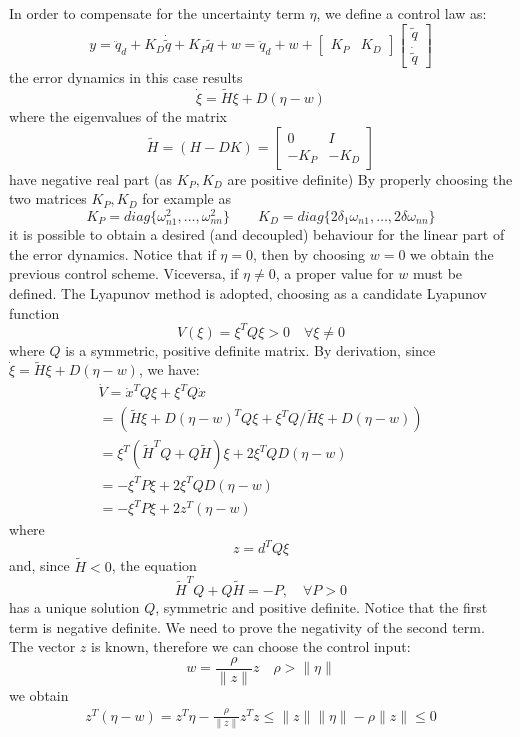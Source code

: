 \documentclass{book}
\begin{document}
In order to compensate for the uncertainty term $\eta$, we define a control law as:
\[
    y = \ddot{q}_d +K_D\dot{\tilde{q}} + K_P\tilde{q}+w = \ddot{q}_d + w + \begin{bmatrix}
        K_P & K_D
    \end{bmatrix} \begin{bmatrix}
    \tilde{q} \\ \dot{\tilde{q}}
    \end{bmatrix}
\]
the error dynamics in this case results
\[
    \dot{\xi} = \tilde{H} \xi + D(\eta-w)
\]
where the eigenvalues of the matrix
\[
    \tilde{H}= (H-DK) = \begin{bmatrix}
        0 & I \\ -K_P & -K_D
    \end{bmatrix}
\]
have negative real part (as $K_P,K_D$ are positive definite)
By properly choosing the two matrices $K_P,K_D$ for example as 
\[
    K_P = diag\{\omega_{n1}^2,\dots,\omega_{nn}^2\} \qquad K_D = diag\{2\delta_1\omega_{n1},\dots,2\delta\omega_{nn}\} 
\]
it is possible to obtain a desired (and decoupled) behaviour for the linear part of the error dynamics. Notice that if $\eta=0$, then by choosing $w=0$ we obtain the previous control scheme. Viceversa, if $\eta\neq 0$, a proper value for $w$ must be defined. The Lyapunov method is adopted, choosing as a candidate Lyapunov function
\[
    V(\xi)=\xi^TQ\xi>0 \quad \forall \xi \neq 0
\]
where $Q$ is a symmetric, positive definite matrix.
By derivation, since $\dot{\xi}=\tilde{H}\xi+D(\eta-w)$, we have:
\begin{gather*}
    \dot{V} = \dot{x}^TQ\xi+\xi^TQ\dot{x}\\
    =(\tilde{H}\xi+D(\eta-w)^TQ\xi+\xi^TQ/\tilde{H}\xi+D(\eta-w))\\
    =\xi^T(\tilde{H}^TQ+Q\tilde{H})\xi+2\xi^TQD(\eta-w)\\
    =-\xi^TP\xi+2\xi^TQD(\eta-w)\\
    =-\xi^TP\xi+2z^T(\eta-w)
\end{gather*}
where\[
    z=d^TQ\xi
\]
and, since $\tilde{H}<0$, the equation 
\[
    \tilde{H}^TQ+Q\tilde{H}=-P, \quad \forall P>0
\]
has a unique solution $Q$, symmetric and positive definite. 
Notice that the first term is negative definite. We need to prove the negativity of the second term. The vector $z$ is known, therefore we can choose the control input:
\[
    w=\displaystyle\frac{\rho}{\|z\|}z \quad \rho>\|\eta\|
\]
we obtain
\begin{gather*}
    z^T(\eta-w)=z^T\eta-\displaystyle\frac{\rho}{\|z\|}z^Tz \leq \|z\|\|\eta\|-\rho\|z\| \leq 0
\end{gather*}
\end{document}
